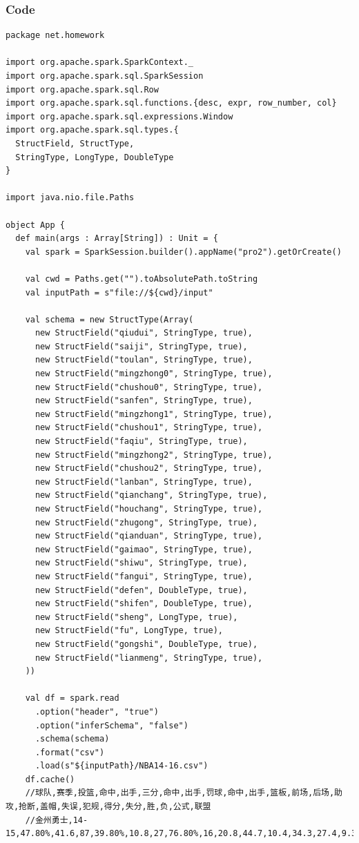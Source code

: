 \documentclass{article}
\begin{document}
\subsubsection{Code}
\begin{center}
\begin{verbatim}
package net.homework

import org.apache.spark.SparkContext._
import org.apache.spark.sql.SparkSession
import org.apache.spark.sql.Row
import org.apache.spark.sql.functions.{desc, expr, row_number, col}
import org.apache.spark.sql.expressions.Window
import org.apache.spark.sql.types.{
  StructField, StructType,
  StringType, LongType, DoubleType
}

import java.nio.file.Paths

object App {
  def main(args : Array[String]) : Unit = {
    val spark = SparkSession.builder().appName("pro2").getOrCreate()

    val cwd = Paths.get("").toAbsolutePath.toString
    val inputPath = s"file://${cwd}/input"

    val schema = new StructType(Array(
      new StructField("qiudui", StringType, true),
      new StructField("saiji", StringType, true),
      new StructField("toulan", StringType, true),
      new StructField("mingzhong0", StringType, true),
      new StructField("chushou0", StringType, true),
      new StructField("sanfen", StringType, true),
      new StructField("mingzhong1", StringType, true),
      new StructField("chushou1", StringType, true),
      new StructField("faqiu", StringType, true),
      new StructField("mingzhong2", StringType, true),
      new StructField("chushou2", StringType, true),
      new StructField("lanban", StringType, true),
      new StructField("qianchang", StringType, true),
      new StructField("houchang", StringType, true),
      new StructField("zhugong", StringType, true),
      new StructField("qianduan", StringType, true),
      new StructField("gaimao", StringType, true),
      new StructField("shiwu", StringType, true),
      new StructField("fangui", StringType, true),
      new StructField("defen", DoubleType, true),
      new StructField("shifen", DoubleType, true),
      new StructField("sheng", LongType, true),
      new StructField("fu", LongType, true),
      new StructField("gongshi", DoubleType, true),
      new StructField("lianmeng", StringType, true),
    ))

    val df = spark.read
      .option("header", "true")
      .option("inferSchema", "false")
      .schema(schema)
      .format("csv")
      .load(s"${inputPath}/NBA14-16.csv")
    df.cache()
    //球队,赛季,投篮,命中,出手,三分,命中,出手,罚球,命中,出手,篮板,前场,后场,助攻,抢断,盖帽,失误,犯规,得分,失分,胜,负,公式,联盟
    //金州勇士,14-15,47.80%,41.6,87,39.80%,10.8,27,76.80%,16,20.8,44.7,10.4,34.3,27.4,9.3,6,14.1,19.9,110,99.8,67,15,81.7,west


\end{verbatim}
\end{center}
\end{document}
